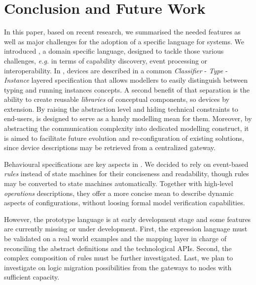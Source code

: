 \section{Conclusion and Future Work}
\label{sec:Conclusion}

In this paper, based on recent research, we summarised the needed features as well as major challenges for the adoption of a specific language for \IOT systems. We introduced \IOTDSL, a domain specific language, designed to tackle those various challenges, \textit{e.g.} in terms of capability discovery, event processing or interoperability. In \IOTDSL, devices are described in a common \textit{Classifier} - \textit{Type} - \textit{Instance} layered specification that allows modellers to easily distinguish between typing and running instances concepts. A second benefit of that separation is the ability to create reusable \textit{libraries} of conceptual components, so \IOT devices by extension. By raising the abstraction level and hiding technical constraints to end-users, \IOTDSL is designed to serve as a handy modelling mean for them. Moreover, by abstracting the communication complexity into dedicated modelling construct, it is aimed to facilitate future evolution and re-configuration of existing solutions, since device descriptions may be retrieved from a centralized gateway.

Behavioural specifications are key aspects in \IOTDSL. We decided to rely on event-based \textit{rules} instead of state machines for their conciseness and readability, though rules may be converted to state machines automatically. Together with high-level \textit{operations} descriptions, they offer a more concise mean to describe dynamic aspects of \IOT configurations, without loosing formal model verification capabilities.

However, the prototype language is at early development stage and some features are currently missing or under development. First, the expression language must be validated on a real world examples and the mapping layer in charge of reconciling the abstract definitions and the technological APIs. Second, the complex composition of rules must be further investigated. Last, we plan to investigate on logic migration possibilities from the gateways to nodes with sufficient capacity. 